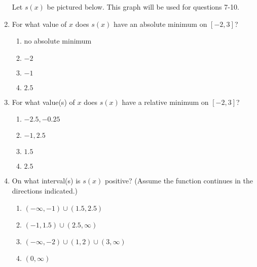 \documentclass{article}
\begin{document}
\begin{enumerate}
\pagebreak 


 
Let $s(x)$ be pictured below. This graph will be used for questions 7-10.

\begin{center}
\end{center}


\item For what value of $x$ does $s(x)$ have an absolute minimum on $[-2,3]$?

  \begin{enumerate}
  \item no absolute minimum
  \item $-2$
  \item $-1$ %
  \item $2.5$
  
  \end{enumerate}


\item For what value(s) of $x$ does $s(x)$ have a relative minimum on $[-2,3]$?

  \begin{enumerate}
  
  \item $-2.5, -0.25$ %
  \item $-1, 2.5$ %
  \item $1.5$ %
  \item $2.5$ %
  
  \end{enumerate}


\item On what interval(s) is $s(x)$ positive? (Assume the function continues in the directions indicated.)
 
 
  \begin{enumerate}
  \item $(-\infty,-1) \cup (1.5,2.5)$ %
  \item $(-1,1.5) \cup (2.5,\infty)$ %
  \item $(-\infty, -2) \cup (1,2) \cup (3,\infty)$ %
  \item $(0,\infty)$ %
  

\end{enumerate}
\end{enumerate}
\end{document}
